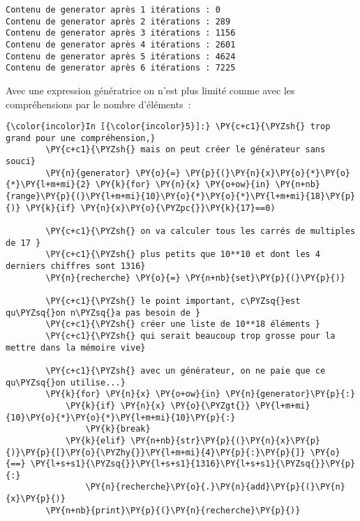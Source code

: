     \begin{Verbatim}[commandchars=\\\{\},frame=single,framerule=0.3mm,rulecolor=\color{cellframecolor}]
Contenu de generator après 1 itérations : 0
Contenu de generator après 2 itérations : 289
Contenu de generator après 3 itérations : 1156
Contenu de generator après 4 itérations : 2601
Contenu de generator après 5 itérations : 4624
Contenu de generator après 6 itérations : 7225
\end{Verbatim}

    Avec une expression génératrice on n'est plus limité comme avec les
compréhensions par le nombre d'éléments~:

    \begin{Verbatim}[commandchars=\\\{\},frame=single,framerule=0.3mm,rulecolor=\color{cellframecolor}]
{\color{incolor}In [{\color{incolor}5}]:} \PY{c+c1}{\PYZsh{} trop grand pour une compréhension,}
        \PY{c+c1}{\PYZsh{} mais on peut créer le générateur sans souci}
        \PY{n}{generator} \PY{o}{=} \PY{p}{(}\PY{n}{x}\PY{o}{*}\PY{o}{*}\PY{l+m+mi}{2} \PY{k}{for} \PY{n}{x} \PY{o+ow}{in} \PY{n+nb}{range}\PY{p}{(}\PY{l+m+mi}{10}\PY{o}{*}\PY{o}{*}\PY{l+m+mi}{18}\PY{p}{)} \PY{k}{if} \PY{n}{x}\PY{o}{\PYZpc{}}\PY{k}{17}==0) 
        
        \PY{c+c1}{\PYZsh{} on va calculer tous les carrés de multiples de 17 }
        \PY{c+c1}{\PYZsh{} plus petits que 10**10 et dont les 4 derniers chiffres sont 1316}
        \PY{n}{recherche} \PY{o}{=} \PY{n+nb}{set}\PY{p}{(}\PY{p}{)}
        
        \PY{c+c1}{\PYZsh{} le point important, c\PYZsq{}est qu\PYZsq{}on n\PYZsq{}a pas besoin de }
        \PY{c+c1}{\PYZsh{} créer une liste de 10**18 éléments }
        \PY{c+c1}{\PYZsh{} qui serait beaucoup trop grosse pour la mettre dans la mémoire vive}
        
        \PY{c+c1}{\PYZsh{} avec un générateur, on ne paie que ce qu\PYZsq{}on utilise...}
        \PY{k}{for} \PY{n}{x} \PY{o+ow}{in} \PY{n}{generator}\PY{p}{:}
            \PY{k}{if} \PY{n}{x} \PY{o}{\PYZgt{}} \PY{l+m+mi}{10}\PY{o}{*}\PY{o}{*}\PY{l+m+mi}{10}\PY{p}{:}
                \PY{k}{break}
            \PY{k}{elif} \PY{n+nb}{str}\PY{p}{(}\PY{n}{x}\PY{p}{)}\PY{p}{[}\PY{o}{\PYZhy{}}\PY{l+m+mi}{4}\PY{p}{:}\PY{p}{]} \PY{o}{==} \PY{l+s+s1}{\PYZsq{}}\PY{l+s+s1}{1316}\PY{l+s+s1}{\PYZsq{}}\PY{p}{:}
                \PY{n}{recherche}\PY{o}{.}\PY{n}{add}\PY{p}{(}\PY{n}{x}\PY{p}{)}
        \PY{n+nb}{print}\PY{p}{(}\PY{n}{recherche}\PY{p}{)}
\end{Verbatim}


